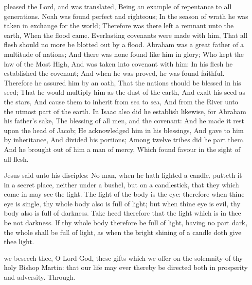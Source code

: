  pleased the Lord, and was translated, Being an example of repentance to all generations. Noah was found perfect and righteous; In the season of wrath he was taken in exchange for the world; Therefore was there left a remnant unto the earth, When the flood came. Everlasting covenants were made with him, That all flesh should no more be blotted out by a flood. Abraham was a great father of a multitude of nations; And there was none found like him in glory; Who kept the law of the Most High, And was taken into covenant with him: In his flesh he established the covenant; And when he was proved, he was found faithful. Therefore he assured him by an oath, That the nations should be blessed in his seed; That he would multiply him as the dust of the earth, And exalt his seed as the stars, And cause them to inherit from sea to sea, And from the River unto the utmost part of the earth. In Isaac also did he establish likewise, for Abraham his father’s sake, The blessing of all men, and the covenant: And he made it rest upon the head of Jacob; He acknowledged him in his blessings, And gave to him by inheritance, And divided his portions; Among twelve tribes did he part them. And he brought out of him a man of mercy, Which found favour in the sight of all flesh.


 Jesus said unto his disciples: No man, when he hath lighted a candle, putteth it in a secret place, neither under a bushel, but on a candlestick, that they which come in may see the light. The light of the body is the eye: therefore when thine eye is single, thy whole body also is full of light; but when thine eye is evil, thy body also is full of darkness. Take heed therefore that the light which is in thee be not darkness. If thy whole body therefore be full of light, having no part dark, the whole shall be full of light, as when the bright shining of a candle doth give thee light.


\secret
{} we beseech thee, O Lord God, these gifts which we offer on the solemnity of thy holy Bishop Martin: that our life may ever thereby be directed both in prosperity and adversity. Through.

